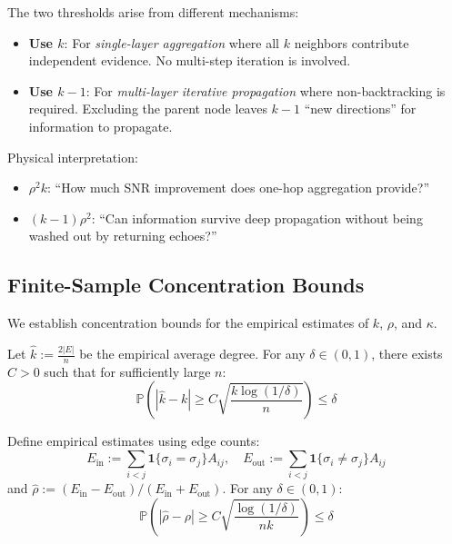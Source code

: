 \begin{remark}
\label{rem:k_vs_k_minus_1}
The two thresholds arise from different mechanisms:
\begin{itemize}
    \item \textbf{Use $k$}: For \textit{single-layer aggregation} where all $k$ neighbors contribute independent evidence. No multi-step iteration is involved.
    \item \textbf{Use $k-1$}: For \textit{multi-layer iterative propagation} where non-backtracking is required. Excluding the parent node leaves $k-1$ ``new directions'' for information to propagate.
\end{itemize}

Physical interpretation:
\begin{itemize}
    \item $\rho^2 k$: ``How much SNR improvement does one-hop aggregation provide?''
    \item $(k-1)\rho^2$: ``Can information survive deep propagation without being washed out by returning echoes?''
\end{itemize}
\end{remark}

\subsection{Finite-Sample Concentration Bounds}
\label{subsec:concentration}

We establish concentration bounds for the empirical estimates of $k$, $\rho$, and $\kappa$.

\begin{lemma}
\label{lem:degree_concentration}
Let $\hat{k} := \frac{2|E|}{n}$ be the empirical average degree. For any $\delta \in (0, 1)$, there exists $C > 0$ such that for sufficiently large $n$:
\begin{equation}
    \mathbb{P}\left(|\hat{k} - k| \geq C\sqrt{\frac{k \log(1/\delta)}{n}}\right) \leq \delta
\end{equation}
\end{lemma}

\begin{lemma}
\label{lem:rho_concentration}
Define empirical estimates using edge counts:
\begin{equation}
    E_{\mathrm{in}} := \sum_{i < j} \mathbf{1}\{\sigma_i = \sigma_j\} A_{ij}, \quad
    E_{\mathrm{out}} := \sum_{i < j} \mathbf{1}\{\sigma_i \neq \sigma_j\} A_{ij}
\end{equation}
and $\hat{\rho} := (E_{\mathrm{in}} - E_{\mathrm{out}}) / (E_{\mathrm{in}} + E_{\mathrm{out}})$. For any $\delta \in (0, 1)$:
\begin{equation}
    \mathbb{P}\left(|\hat{\rho} - \rho| \geq C\sqrt{\frac{\log(1/\delta)}{nk}}\right) \leq \delta
\end{equation}
\end{lemma}

